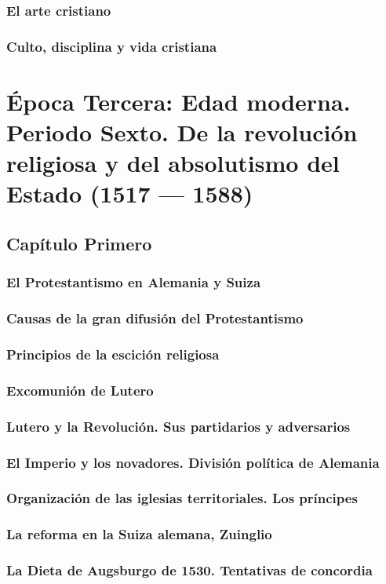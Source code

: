 \raggedbottom{} \documentclass[12pt, a4paper, openany]{book} %
\begin{document}
\section{El arte cristiano}
\section{Culto, disciplina y vida cristiana}
\part{Época Tercera: Edad moderna. Periodo Sexto. De la revolución religiosa y del absolutismo del Estado (1517 --- 1588)}
\chapter{Capítulo Primero}
\section{El Protestantismo en Alemania y Suiza}
\section{Causas de la gran difusión del Protestantismo}
\section{Principios de la escición religiosa}
\section{Excomunión de Lutero}
\section{Lutero y la Revolución. Sus partidarios y adversarios}
\section{El Imperio y los novadores. División política de Alemania}
\section{Organización de las iglesias territoriales. Los príncipes}
\section{La reforma en la Suiza alemana, Zuinglio}
\section{La Dieta de Augsburgo de 1530. Tentativas de concordia}
\end{document}

